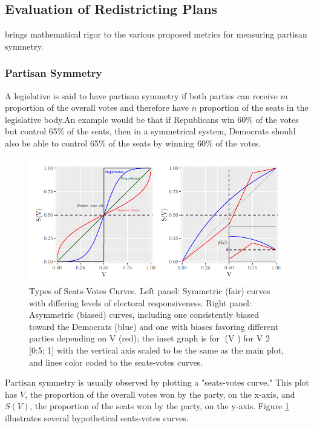 \subsection{Evaluation of Redistricting Plans}

\textcite{katz2020} brings mathematical rigor to the various proposed metrics for measuring partisan symmetry. 

\subsubsection{Partisan Symmetry}

A legislative is said to have partisan symmetry if both parties can receive $m$ proportion of the overall votes and therefore have $n$ proportion of the seats in the legislative body.An example would be that if Republicans win 60\% of the votes but control 65\% of the seats, then in a symmetrical system, Democrats should also be able to control 65\% of the seats by winning 60\% of the votes. \textcite{katz2020}

\begin{figure}
    \includegraphics[width=\linewidth]{img/seatsvotes.png}
    \caption{Types of Seats-Votes Curves. Left panel: Symmetric (fair) curves with differing
    levels of electoral responsiveness. Right panel: Asymmetric (biased) curves, including
    one consistently biased toward the Democrats (blue) and one with biases favoring different
    parties depending on V (red); the inset graph is for (V ) for V 2 [0:5; 1] with the vertical
    axis scaled to be the same as the main plot, and lines color coded to the seats-votes curves. \parencite[175]{katz2020}}
    \label{fig:seatsvotes1}
\end{figure}

Partisan symmetry is usually observed by plotting a "seats-votes curve." This plot has $V$, the proportion of the overall votes won by the party, on the x-axis, and $S(V)$, the proportion of the seats won by the party, on the y-axis. Figure \ref{fig:seatsvotes1} \parencite[175]{katz2020} illustrates several hypothetical seats-votes curves.

